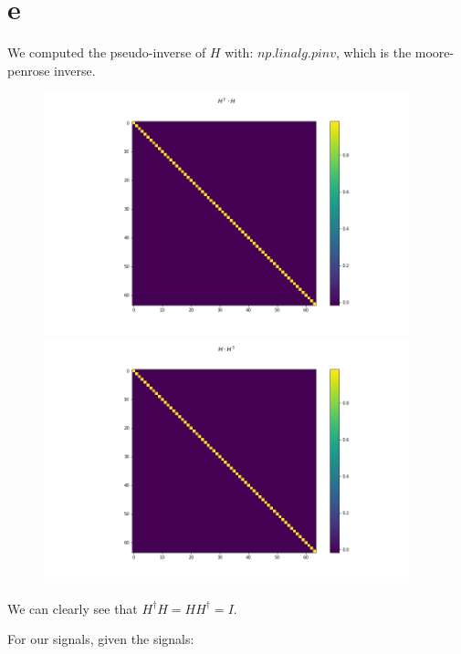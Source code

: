 \documentclass[a4paper]{article}
\begin{document}
\newpage 

\section*{e}

We computed the pseudo-inverse of $H$ with: $np.linalg.pinv$, which is the moore-penrose inverse.

\begin{figure}[h]
    \centering
    \includegraphics[width=400,keepaspectratio]{hw/hw4/imgs/p2q1e_h_dagger_h.png}
    \includegraphics[width=400,keepaspectratio]{hw/hw4/imgs/p2q1e_h_h_dagger.png}
\end{figure}

We can clearly see that $H^\dagger H = HH^\dagger = I$.

\newpage 

For our signals, given the signals:
\end{document}
